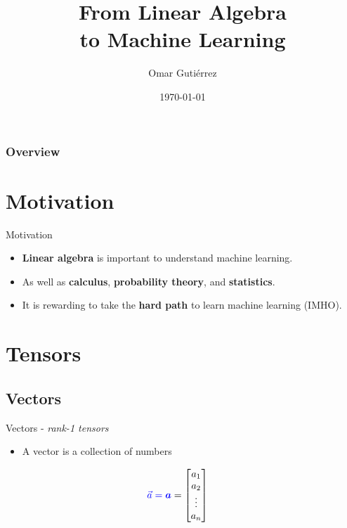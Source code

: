 \documentclass[handout]{beamer}
\title[\insertdate]{From Linear Algebra\\to Machine Learning}
\author{Omar Guti\'errez}
\institute{@trinogz}
\date{\today}
\begin{document}
\maketitle

\begin{frame}
    \frametitle{Overview}
    \tableofcontents
\end{frame}


\section{Motivation}
\begin{frame}{Motivation}
    \begin{itemize}
        \item \textbf{Linear algebra} is important to understand machine learning.
        \item As well as \textbf{calculus}, \textbf{probability theory}, and \textbf{statistics}.
        \item It is rewarding to take the \textbf{hard path} to learn machine learning (IMHO).
    \end{itemize}
\end{frame}




\section{Tensors}
\subsection{Vectors}

\begin{frame}{Vectors - \textit{rank-1 tensors}}
    \begin{itemize}
        \item A vector is a collection of numbers
    \end{itemize}
    \Huge
    \begin{align*} 
        \textcolor{blue}{\vec{a} = \boldsymbol{a}} &= \begin{bmatrix}
           a_{1}  \\
           a_{2}  \\
           \vdots \\
           a_{n}  
         \end{bmatrix}
    \end{align*}
\end{frame}
\end{document}
